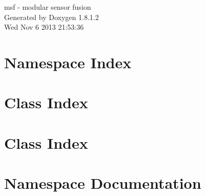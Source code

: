 \documentclass{book}
\begin{document}
\hypersetup{pageanchor=false,citecolor=blue}
\begin{titlepage}
\vspace*{7cm}
\begin{center}
{\Large msf -\/ modular sensor fusion }\\
\vspace*{1cm}
{\large Generated by Doxygen 1.8.1.2}\\
\vspace*{0.5cm}
{\small Wed Nov 6 2013 21:53:36}\\
\end{center}
\end{titlepage}
\clearemptydoublepage
{}
\tableofcontents
\clearemptydoublepage
{}
\hypersetup{pageanchor=true,citecolor=blue}
\chapter{Namespace Index}

\chapter{Class Index}

\chapter{Class Index}

\chapter{Namespace Documentation}

\end{document}
